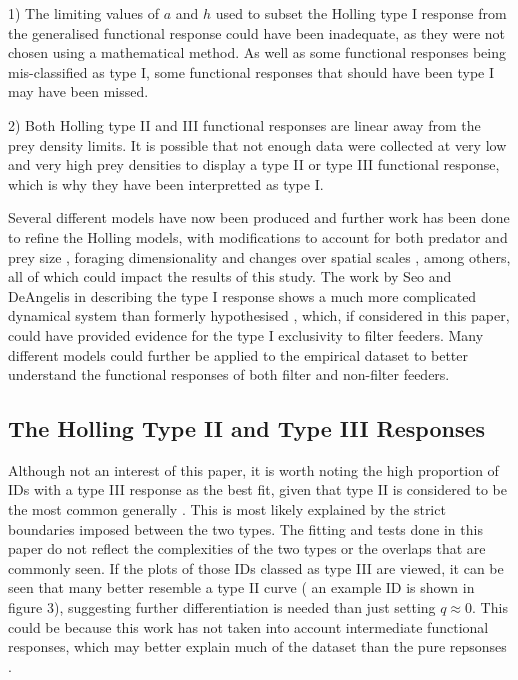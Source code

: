 \documentclass[11pt, a4paper, titlepage]{article}
\begin{document}
1) The limiting values of $a$ and $h$ used to subset the Holling type I response from the generalised functional response could have been inadequate, as they were not chosen using a mathematical method. As well as some functional responses being mis-classified as type I, some functional responses that should have been type I may have been missed.

2) Both Holling type II and III functional responses are linear away from the prey density limits. It is possible that not enough data were collected at very low and very high prey densities to display a type II or type III functional response, which is why they have been interpretted as type I.

Several different models have now been produced and  further work has been done to refine the Holling models, with modifications to account for both predator and prey size \parencite{Aljetlawi2004}, foraging dimensionality \parencite{Pawar2012} and changes over spatial scales \parencite{Rincon2017}, among others, all of which could impact the results of this study. The work by Seo and DeAngelis in describing the type I response shows a much more complicated dynamical system than formerly hypothesised \parencite{Seo2011}, which, if considered in this paper, could have provided evidence for the type I exclusivity to filter feeders. Many different models could further be applied to the empirical dataset to better understand the functional responses of both filter and non-filter feeders.

\subsection{The Holling Type II and Type III Responses}

Although not an interest of this paper, it is worth noting the high proportion of IDs with a type III response as the best fit, given that type II is considered to be the most common generally \parencite{Holling1959b}. This is most likely explained by the strict boundaries imposed between the two types. The fitting and tests done in this paper do not reflect the complexities of the two types or the overlaps that are commonly seen. If the plots of those IDs classed as type III are viewed, it can be seen that many better resemble a type II curve ( an example ID is shown in figure 3), suggesting further differentiation is needed than just setting $q\approx0$. This could be because this work has not taken into account intermediate functional responses, which may better explain much of the dataset than the pure repsonses \parencite{Jeschke2004}.
\end{document}
